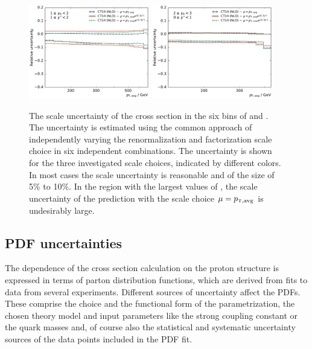\begin{figure}[htp]
    \includegraphics[width=0.47\textwidth]{figures/theory/scale_uncert_comp_yb1ys1.pdf}\hfill
    \includegraphics[width=0.47\textwidth]{figures/theory/scale_uncert_comp_yb2ys0.pdf}
    \caption[Scale uncertainties of NLO calculation]{The scale uncertainty of
        the cross section in the six bins of \ystar and
        \yboost. The uncertainty is estimated using the common approach of
        independently varying the renormalization and factorization scale choice
        in six independent combinations. The uncertainty is shown for the three
        investigated scale choices, indicated by different colors. In most cases
        the scale uncertainty is reasonable and of the size of 5\% to 10\%. In
        the region with the largest values of \ystar, the scale uncertainty of
        the prediction with the scale choice $\mu=\ptavg$ is undesirably large.}
    \label{fig:scale_uncertainties}
\end{figure}

\subsection{PDF uncertainties}
\label{sec:pdf_uncertainties}

The dependence of the cross section calculation on the proton structure is
expressed in terms of parton distribution functions, which are derived from fits
to data from several experiments. Different sources of uncertainty affect the
PDFs. These comprise the choice and the functional form of the parametrization,
the chosen theory model and input parameters like the strong coupling constant
\as or the quark masses and, of course also the statistical and systematic
uncertainty sources of the data points included in the PDF fit.

